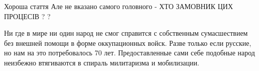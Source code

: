\begin{itemize}

Хороша стаття Але не вказано самого головного - ХТО ЗАМОВНИК ЦИХ ПРОЦЕСІВ ? ?


Ни где в мире ни один народ не смог справится с собственным сумасшествием без
внешней помощи в форме оккупационных войск. Разве только если русские, но нам
на это потребовалось 70 лет. Предоставленные сами себе подобные народ неизбежно
втягиваются в спираль милитаризма и мобилизации.

\end{itemize} %
